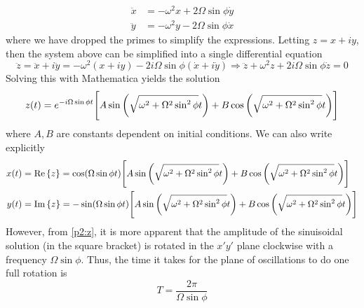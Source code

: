 \documentclass[12pt]{article}
\begin{document}
\begin{problem}{2}
\begin{solution}
\begin{subequations}
    \begin{align}
        \ddot{x}&=-\omega^2x+2\Omega\sin\phi\dot{y}\\ 
        \ddot{y}&=-\omega^2y-2\Omega\sin\phi\dot{x}
    \end{align} 
\end{subequations}
where we have dropped the primes to simplify the expressions. Letting $z=x+iy$,
then the system above can be simplified into a single differential equation
\begin{equation}
    \ddot{z}=\ddot{x}+i\ddot{y}
    =-\omega^2(x+iy)-2i\Omega\sin\phi(\dot{x}+i\dot{y})
    \Rightarrow
    \ddot{z}+\omega^2z+2i\Omega\sin\phi\dot{z}=0
\end{equation}
Solving this with Mathematica yields the solution
\begin{equation}\label{p2:z}
    z(t)=e^{-i\Omega\sin\phi
    t}\qty[A\sin\qty(\sqrt{\omega^2+\Omega^2\sin^2\phi}t)
    +B\cos\qty(\sqrt{\omega^2+\Omega^2\sin^2\phi}t)] 
\end{equation}
where $A,B$ are constants dependent on initial conditions. We can also write
explicitly
\begin{subequations}
    \begin{align}
        x(t)&=\Re\qty{z}
        =\cos(\Omega\sin\phi t)\qty[A\sin\qty(\sqrt{\omega^2+\Omega^2\sin^2\phi}t)
    +B\cos\qty(\sqrt{\omega^2+\Omega^2\sin^2\phi}t)]\\
        y(t)&=\Im\qty{z}
        =-\sin(\Omega\sin\phi t)\qty[A\sin\qty(\sqrt{\omega^2+\Omega^2\sin^2\phi}t)
    +B\cos\qty(\sqrt{\omega^2+\Omega^2\sin^2\phi}t)] 
    \end{align} 
\end{subequations}
However, from \eqref{p2:z}, it is more apparent that the amplitude of
the sinuisoidal solution (in the square bracket) is rotated in the $x'y'$ plane 
clockwise with a frequency $\Omega\sin\phi$. Thus, the time it takes for the 
plane of oscillations to do one full rotation is
\begin{equation}
    T=\frac{2\pi}{\Omega\sin\phi} 
\end{equation}
\end{solution}
\end{problem}
\end{document}
